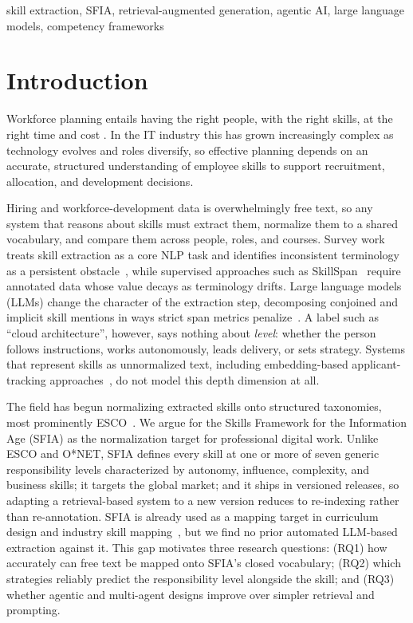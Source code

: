 \documentclass[conference]{IEEEtran}
\begin{document}
\begin{IEEEkeywords}
skill extraction, SFIA, retrieval-augmented generation, agentic AI, large language models, competency frameworks
\end{IEEEkeywords}

\section{Introduction}\label{sec:introduction}

Workforce planning entails having the right people, with the right skills, at the right time and cost \cite{santos2009workforce}. In the IT industry this has grown increasingly complex as technology evolves and roles diversify, so effective planning depends on an accurate, structured understanding of employee skills to support recruitment, allocation, and development decisions.

Hiring and workforce-development data is overwhelmingly free text, so any system that reasons about skills must extract them, normalize them to a shared vocabulary, and compare them across people, roles, and courses. Survey work treats skill extraction as a core NLP task and identifies inconsistent terminology as a persistent obstacle~\cite{senger2024survey}, while supervised approaches such as SkillSpan~\cite{zhang2022skillspan} require annotated data whose value decays as terminology drifts. Large language models (LLMs) change the character of the extraction step, decomposing conjoined and implicit skill mentions in ways strict span metrics penalize~\cite{nguyen2024rethinking}. A label such as ``cloud architecture'', however, says nothing about \emph{level}: whether the person follows instructions, works autonomously, leads delivery, or sets strategy. Systems that represent skills as unnormalized text, including embedding-based applicant-tracking approaches~\cite{resume2vec2025}, do not model this depth dimension at all.

The field has begun normalizing extracted skills onto structured taxonomies, most prominently ESCO~\cite{clavie2023esco,skillmo2025}. We argue for the Skills Framework for the Information Age (SFIA) as the normalization target for professional digital work. Unlike ESCO and O*NET, SFIA defines every skill at one or more of seven generic responsibility levels characterized by autonomy, influence, complexity, and business skills; it targets the global market; and it ships in versioned releases, so adapting a retrieval-based system to a new version reduces to re-indexing rather than re-annotation. SFIA is already used as a mapping target in curriculum design and industry skill mapping~\cite{mapping2016sfia,vonkonsky2016sfia, sfia2024}, but we find no prior automated LLM-based extraction against it. This gap motivates three research questions: (RQ1) how accurately can free text be mapped onto SFIA's closed vocabulary; (RQ2) which strategies reliably predict the responsibility level alongside the skill; and (RQ3) whether agentic and multi-agent designs improve over simpler retrieval and prompting.
\end{document}
